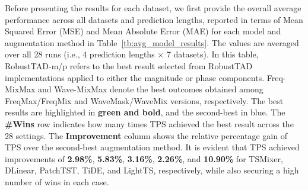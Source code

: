Before presenting the results for each dataset, we first provide the overall average performance across all datasets and prediction lengths, reported in terms of Mean Squared Error (MSE) and Mean Absolute Error (MAE) for each model and augmentation method in Table~\ref{tb:avg_model_results}. The values are averaged over all 28 runs (i.e., 4 prediction lengths × 7 datasets).
In this table, RobustTAD-m/p refers to the best result selected from RobustTAD implementations applied to either the magnitude or phase components. Freq-MixMax and Wave-MixMax denote the best outcomes obtained among FreqMax/FreqMix and WaveMask/WaveMix versions, respectively. The best results are highlighted in \textbf{green and bold}, and the second-best in blue. The \textbf{\#Wins} row indicates how many times TPS achieved the best result across the 28 settings. The \textbf{Improvement} column shows the relative percentage gain of TPS over the second-best augmentation method. It is evident that TPS achieved improvements of \textbf{2.98\%}, \textbf{5.83\%}, \textbf{3.16\%}, \textbf{2.26\%}, and \textbf{10.90\%} for TSMixer, DLinear, PatchTST, TiDE, and LightTS, respectively, while also securing a high number of wins in each case. 

